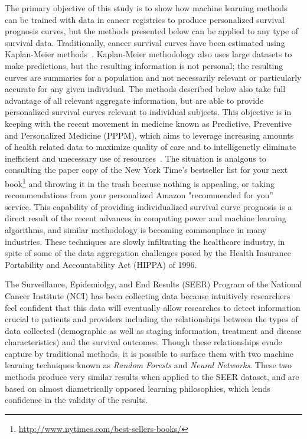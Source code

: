 \documentclass[a4paper,11pt]{article}
\begin{document}
The primary objective of this study is to show how machine learning methods can be trained with data in cancer registries to produce personalized survival prognosis curves, but the methods presented below can be applied to any type of survival data. Traditionally, cancer survival curves have been estimated using Kaplan-Meier methods~\cite{cam}. Kaplan-Meier methodology also uses large datasets to make predictions, but the resulting information is not personal; the resulting curves are summaries for a population and not necessarily relevant or particularly accurate for any given individual.  The methods described below also take full advantage of all relevant aggregate information, but are able to provide personalized survival curves relevant to individual subjects. This objective is in keeping with the recent movement in medicine known as Predictive, Preventive and Personalized Medicine (PPPM), which aims to leverage increasing amounts of health related data to maximize quality of care and to intelligenctly eliminate inefficient and unecessary use of resources~\cite{VanPoucke2016}.
The situation is analgous to consulting the paper copy of the New York Time's bestseller list for your next book\footnote{\url{http://www.nytimes.com/best-sellers-books/}} and throwing it in the trash because nothing is appealing, or taking recommendations from your personalized Amazon "recommended for you'' service.
This capability of providing individualized survival curve prognosis is a direct result of the recent advances in computing power and machine learning algorithms, and similar methodology is becoming commonplace in many industries.
 These techniques are slowly infiltrating the healthcare industry, in spite of some of the data aggregation challenges posed by the Health Insurance Portability and Accountability Act (HIPPA) of 1996.



The Surveillance, Epidemiolgy, and End Results (SEER) Program of the National Cancer Institute (NCI) has been collecting data because intuitively 
researchers feel confident
 that this data will eventually allow researches to detect information crucial to patients and providers including the relationships between the types of data collected (demographic as well as staging information, treatment and disease characteristics) and the survival outcomes.
Though these relationships evade capture by traditional methods, it is possible to surface them with two machine learning techniques known as \emph{Random Forests} and \emph{Neural Networks}. These two methods produce very similar results when applied to the SEER dataset, and are based on almost diametrically opposed learning philosophies, which lends confidence in the validity of the results.
\end{document}
